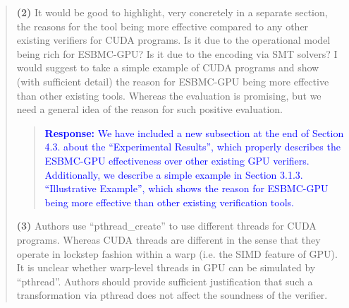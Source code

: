 \documentclass[11pt]{article}
\begin{document}
\begin{quote}
{\bf(2)} It would be good to highlight, very concretely in a separate section, the reasons
for the tool being more effective compared to any other existing verifiers for
CUDA programs. Is it due to the operational model being rich for ESBMC-GPU? Is it
due to the encoding via SMT solvers? I would suggest to take a simple example of
CUDA programs and show (with sufficient detail) the reason for ESBMC-GPU being
more effective than other existing tools. Whereas the evaluation is promising, but
we need a general idea of the reason for such positive evaluation.

\begin{quote}
\textcolor{blue}{\textbf{Response:} We have included a new subsection at the end of Section 4.3. about the ``Experimental Results'', which properly describes the ESBMC-GPU effectiveness over other existing GPU verifiers. Additionally, we describe a simple example in Section 3.1.3. ``Illustrative Example'', which shows the reason for ESBMC-GPU being more effective than other existing verification tools.} 
\end{quote}

{\bf(3)} Authors use ``pthread\_create'' to use different threads for CUDA programs. Whereas
CUDA threads are different in the sense that they operate in lockstep fashion
within a warp (i.e. the SIMD feature of GPU). It is unclear whether warp-level
threads in GPU can be simulated by ``pthread''. Authors should provide sufficient
justification that such a transformation via pthread does not affect the soundness
of the verifier.


\end{quote}
\end{document}
